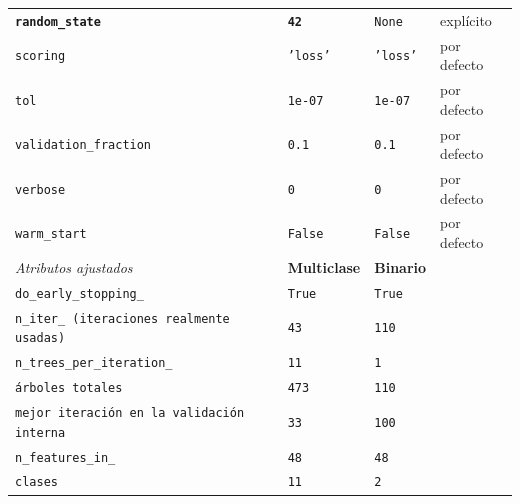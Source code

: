 \begin{longtable}{L{3.9cm} L{3.7cm} L{3.0cm} L{2.4cm}}
\textbf{\texttt{random\_state}} & \textbf{\texttt{42}} & \texttt{None} & explícito \\
\texttt{scoring} & \texttt{'loss'} & \texttt{'loss'} & por defecto \\
\texttt{tol} & \texttt{1e-07} & \texttt{1e-07} & por defecto \\
\texttt{validation\_fraction} & \texttt{0.1} & \texttt{0.1} & por defecto \\
\texttt{verbose} & \texttt{0} & \texttt{0} & por defecto \\
\texttt{warm\_start} & \texttt{False} & \texttt{False} & por defecto \\
\midrule
\emph{Atributos ajustados} & \textbf{Multiclase} & \textbf{Binario} & \\
\texttt{do\_early\_stopping\_} & \texttt{True} & \texttt{True} & \\
\texttt{n\_iter\_ (iteraciones realmente usadas)} & \texttt{43} & \texttt{110} & \\
\texttt{n\_trees\_per\_iteration\_} & \texttt{11} & \texttt{1} & \\
\texttt{árboles totales} & \texttt{473} & \texttt{110} & \\
\texttt{mejor iteración en la validación interna} & \texttt{33} & \texttt{100} & \\
\texttt{n\_features\_in\_} & \texttt{48} & \texttt{48} & \\
\texttt{clases} & \texttt{11} & \texttt{2} & \\
\end{longtable}

